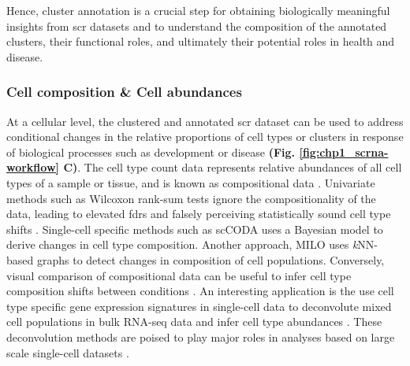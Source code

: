 \par Hence, cluster annotation is a crucial step for obtaining biologically meaningful insights from \gls{scr} datasets and to understand the composition of the annotated clusters, their functional roles, and ultimately their potential roles in health and disease.



\subsubsection{Cell composition \& Cell abundances}
At a cellular level, the clustered and annotated \gls{scr} dataset can be used to address conditional changes in the relative proportions of cell types or clusters in response of biological processes such as development or disease \textbf{(Fig. \ref{fig:chp1_scrna-workflow} C)}. %
The cell type count data represents relative abundances of all cell types of a sample or tissue, and is known as compositional data \textbf{\cite{ostner_compositional_nodate}}. Univariate methods such as Wilcoxon rank-sum tests ignore the compositionality of the data, leading to elevated \glspl{fdr} and falsely perceiving statistically sound cell type shifts \textbf{\cite{ostner_compositional_nodate}}. Single-cell specific methods such as scCODA \textbf{\cite{buttner_sccoda_2021}} uses a Bayesian model to derive changes in cell type composition. Another approach, MILO \textbf{\cite{dann_differential_2022}} uses \textit{k}NN-based graphs to detect changes in composition of cell populations. Conversely, visual comparison of compositional data can be useful to infer cell type composition shifts between conditions \textbf{\cite{lueckenmalte_d_current_2019}}. An interesting application is the use cell type specific gene expression signatures in single-cell data to deconvolute mixed cell populations in bulk RNA-seq data and infer cell type abundances \textbf{\cite{newman_robust_2015,newman_determining_2019,chu_cell_2022}}. These deconvolution methods are poised to play major roles in analyses based on large scale single-cell datasets \textbf{\cite{cobos_effective_2023}}. 

